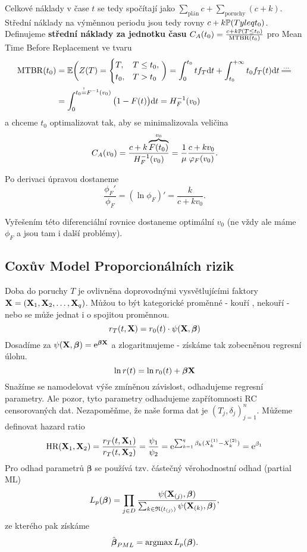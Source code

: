 Celkové náklady v čase $t$ se tedy spočítají jako $\sum_{\text{plán}}c+\sum_{\text{poruchy}}(c+k)$. Střední náklady na výměnnou periodu jsou tedy rovny $c+k\mathbb{P}(Tyleq t_0)$. Definujeme \textbf{střední náklady za jednotku času} $C_A(t_0)=\frac{c+k\mathbb{P}(T\leq t_0)}{\mathrm{MTBR}(t_0)}$ pro Mean Time Before Replacement ve tvaru \[
\begin{split}
	\mathrm{MTBR}(t_0)&=\E\bigg(Z(T)=\begin{cases}
		T,& T\leq t_0,\\ t_0,& T>t_0
	\end{cases}\bigg)=\int_{0}^{t_0}tf_T\d t+\int_{t_0}^{+\infty}t_0 f_T(t)\d t\equal{...} \\ &= \int_{0}^{t_0\stackrel{!}{=}\inv{F}(v_0)}\big(1-F(t)\big)\d t=\HF(v_0) 
\end{split}
\]  a chceme $t_0$ optimalizovat tak, aby se minimalizovala veličina $$C_A(v_0)=\frac{c+k\overbrace{F(t_0)}^{v_0}}{H_F^{-1}(v_0)}=\frac{1}{\mu}\frac{c+kv_0}{\varphi_F(v_0)}.$$

Po derivaci úpravou dostaneme 
$$ \frac{\phi_F'}{\phi_F}=(\ln \phi_F)'=\frac{k}{c+kv_0}.$$

Vyřešením této diferenciální rovnice dostaneme optimální $v_0$ (ne vždy ale máme $\phi_F$ a jsou tam i další problémy).

\subsection{Coxův Model Proporcionálních rizik}
Doba do poruchy $T$ je ovlivněna doprovodnými vysvětlujícími faktory $\bold{X} =  (\bold{X}_1, \bold{X}_2,\dots, \bold{X}_q)$. Můžou to být kategorické proměnné - kouří , nekouří - nebo se může jednat i o spojitou proměnnou.
$$ r_T(t,\bold{X}) = r_0(t) \cdot \psi(\bold{X}, \boldsymbol{\beta})$$
Dosadíme za $\psi(\bold{X}, \boldsymbol{\beta}) = \mathrm{e}^{\boldsymbol{\beta}\bold{X}} $ a zlogaritmujeme - získáme tak zobecněnou regresní úlohu.
$$\ln r(t) = \ln r_0(t) + \boldsymbol{\beta}\bold{X} $$
Snažíme se namodelovat výše zmíněnou závislost, odhadujeme regresní parametry. Ale pozor, tyto parametry odhadujeme zapřítomnosti RC censorovaných dat. Nezapoměňme, že naše forma dat je $(T_j, \delta_j)_{j=1}^n$. Můžeme definovat hazard ratio
$$ \mathrm{HR(\bold{X}_1, \bold{X}_2)} = \frac{r_T(t, \bold{X}_1)}{r_T(t, \bold{X}_2)} = \frac{\psi_1}{\psi_2} = \mathrm{e}^{\sum_{k=1}^{q} \beta_k(X_k^{(1)}- X_k^{(2)})} = \mathrm{e}^{\beta_1}$$
Pro odhad parametrů $\boldsymbol{\beta}$ se používá tzv. částečný věrohodnostní odhad (partial ML)
$$L_p(\boldsymbol{\beta})  =\prod_{j\in D } \frac{\psi(\bold{X}_{(j)}, \boldsymbol{\beta})}{\sum_{k \in \mathfrak{R}(t_{(j)})}\psi(\bold{X}_{(k)}, \boldsymbol{\beta})},$$
ze kterého pak získáme
$$ \hat{\boldsymbol{\beta}}_{PML} = \mathop{\mathrm{argmax}} L_p(\boldsymbol{\beta}).$$


